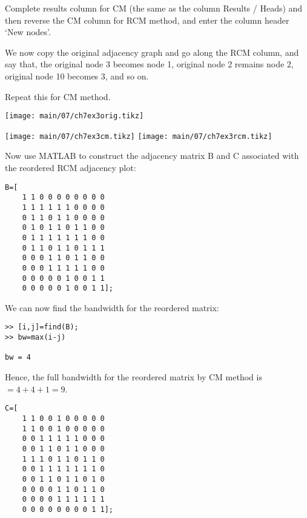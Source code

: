\begin{enumerate}
    Complete results column for CM (the same as the column Results / Heads) and
    then reverse the CM column for RCM method, and enter the column header
    `New nodes'.

    We now copy the original adjacency graph and go along the RCM column, and
    say that, the original node 3 becomes node 1, original node 2 remains node 2,
    original node 10 becomes 3, and so on.

    Repeat this for CM method.

    \begin{center}
        \texttt{[image: main/07/ch7ex3orig.tikz]}

        \vspace{1em}
        \texttt{[image: main/07/ch7ex3cm.tikz]}
        \hspace{\fill}
        \texttt{[image: main/07/ch7ex3rcm.tikz]}
    \end{center}

    \newpage
    Now use MATLAB to construct the adjacency matrix B and C associated with the
    reordered RCM adjacency plot:

    \begin{minipage}[t]{0.49\linewidth}
        \vspace{-2em}
        \begin{lstlisting}
B=[
    1 1 0 0 0 0 0 0 0 0
    1 1 1 1 1 1 0 0 0 0
    0 1 1 0 1 1 0 0 0 0
    0 1 0 1 1 0 1 1 0 0
    0 1 1 1 1 1 1 1 0 0
    0 1 1 0 1 1 0 1 1 1
    0 0 0 1 1 0 1 1 0 0
    0 0 0 1 1 1 1 1 0 0
    0 0 0 0 0 1 0 0 1 1
    0 0 0 0 0 1 0 0 1 1];
        \end{lstlisting}

        We can now find the bandwidth for the reordered matrix:
        \begin{lstlisting}
>> [i,j]=find(B);
>> bw=max(i-j)

bw = 4
        \end{lstlisting}
    \end{minipage}
    \begin{minipage}[t]{0.5\linewidth}
        
    \end{minipage}

    Hence, the full bandwidth for the reordered matrix by CM method is
    $= 4 + 4 + 1 = 9$.

    \begin{minipage}[t]{0.49\linewidth}
        \begin{lstlisting}
C=[
    1 1 0 0 1 0 0 0 0 0
    1 1 0 0 1 0 0 0 0 0
    0 0 1 1 1 1 1 0 0 0
    0 0 1 1 0 1 1 0 0 0
    1 1 1 0 1 1 0 1 1 0
    0 0 1 1 1 1 1 1 1 0
    0 0 1 1 0 1 1 0 1 0
    0 0 0 0 1 1 0 1 1 0
    0 0 0 0 1 1 1 1 1 1
    0 0 0 0 0 0 0 0 1 1];
        \end{lstlisting}


\end{minipage}
\end{enumerate}
